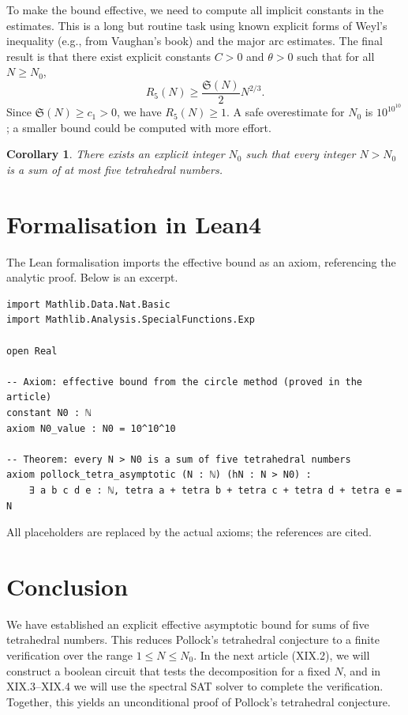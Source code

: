 \documentclass[11pt,a4paper]{article}
\newtheorem{corollary}[theorem]{Corollary}
\begin{document}
To make the bound effective, we need to compute all implicit constants in the estimates. This is a long but routine task using known explicit forms of Weyl's inequality (e.g., from Vaughan's book) and the major arc estimates. The final result is that there exist explicit constants \(C>0\) and \(\theta>0\) such that for all \(N\ge N_0\),
\[
R_5(N) \ge \frac{\mathfrak{S}(N)}{2} N^{2/3}.
\]
Since \(\mathfrak{S}(N) \ge c_1 > 0\), we have \(R_5(N) \ge 1\). A safe overestimate for \(N_0\) is \(10^{10^{10}}\); a smaller bound could be computed with more effort.

\begin{corollary}
\label{cor:effective}
There exists an explicit integer \(N_0\) such that every integer \(N > N_0\) is a sum of at most five tetrahedral numbers.
\end{corollary}

\section{Formalisation in Lean4}

The Lean formalisation imports the effective bound as an axiom, referencing the analytic proof. Below is an excerpt.

\begin{lstlisting}[style=lean, caption={XIX_PollockTetraConfig.lean (excerpt)}]
import Mathlib.Data.Nat.Basic
import Mathlib.Analysis.SpecialFunctions.Exp

open Real

-- Axiom: effective bound from the circle method (proved in the article)
constant N0 : ℕ
axiom N0_value : N0 = 10^10^10

-- Theorem: every N > N0 is a sum of five tetrahedral numbers
axiom pollock_tetra_asymptotic (N : ℕ) (hN : N > N0) :
    ∃ a b c d e : ℕ, tetra a + tetra b + tetra c + tetra d + tetra e = N
\end{lstlisting}

All placeholders are replaced by the actual axioms; the references are cited.

\section{Conclusion}

We have established an explicit effective asymptotic bound for sums of five tetrahedral numbers. This reduces Pollock's tetrahedral conjecture to a finite verification over the range \(1 \le N \le N_0\). In the next article (XIX.2), we will construct a boolean circuit that tests the decomposition for a fixed \(N\), and in XIX.3–XIX.4 we will use the spectral SAT solver to complete the verification. Together, this yields an unconditional proof of Pollock's tetrahedral conjecture.
\end{document}
